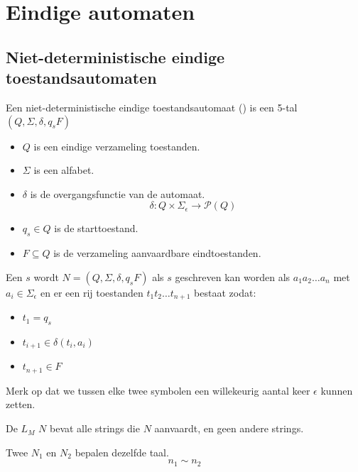 \documentclass[main.tex]{subfiles}
\begin{document}
\chapter{Eindige automaten}
\label{cha:eindige-automaten}

\section{Niet-deterministische eindige toestandsautomaten}
\label{sec:niet-deterministische-eindige-automaten}

\begin{de}
  Een niet-deterministische eindige toestandsautomaat () is een 5-tal $(Q,\Sigma,\delta,q_{s}F)$
  \begin{itemize}
  \item $Q$ is een eindige verzameling toestanden.
  \item $\Sigma$ is een alfabet.
  \item $\delta$ is de overgangsfunctie van de automaat.
  \[ \delta: Q \times \Sigma_{\epsilon} \rightarrow \mathcal{P}(Q) \]
  \item $q_{s} \in Q$ is de starttoestand.
  \item $F \subseteq Q$ is de verzameling aanvaardbare eindtoestanden.
  \end{itemize}
\end{de}

\begin{de}
  Een  $s$ wordt  $N=(Q,\Sigma,\delta,q_{s}F)$ als $s$ geschreven kan worden als $a_{1}a_{2}\ldots a_{n}$ met $a_{i} \in \Sigma_{\epsilon}$ en er een rij toestanden $t_{1}t_{2}\ldots t_{n+1}$ bestaat zodat:
  \begin{itemize}
  \item $t_{1} = q_{s}$
  \item $t_{i+1} \in \delta(t_{i},a_{i})$
  \item $t_{n+1} \in F$
  \end{itemize}
  Merk op dat we tussen elke twee symbolen een willekeurig aantal keer $\epsilon$ kunnen zetten.
\end{de}

\begin{de}
  De  $L_{M}$  $N$ bevat alle strings die $N$ aanvaardt, en geen andere strings.
\end{de}

\begin{de}
  Twee  $N_{1}$ en $N_{2}$ bepalen dezelfde taal.
  \[ n_{1} \sim n_{2} \]
\end{de}
\end{document}
